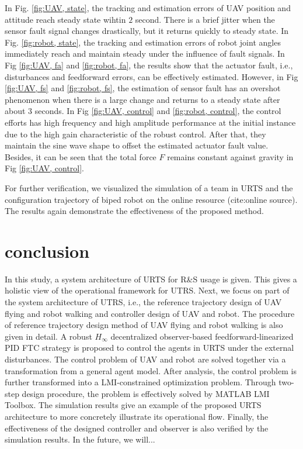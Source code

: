 \documentclass{ieeeaccess}
\begin{document}
In Fig. \ref{fig:UAV, state}, the tracking and estimation errors of UAV position and attitude reach steady state wihtin $2$ second. There is a brief jitter when the sensor fault signal changes drastically, but it returns quickly to steady state. In Fig. \ref{fig:robot, state}, the tracking and estimation errors of robot joint angles immediately reach and maintain steady under the influence of fault signals. In Fig \ref{fig:UAV, fa} and \ref{fig:robot, fa}, the results show that the actuator fault, i.e., disturbances and feedforward errors, can be effectively estimated. However, in Fig \ref{fig:UAV, fs} and \ref{fig:robot, fs}, the estimation of sensor fault has an overshot phenomenon when there is a large change and returns to a steady state after about $3$ seconds. In Fig \ref{fig:UAV, control} and \ref{fig:robot, control}, the control efforts has high frequency and high amplitude performance at the initial instance due to the high gain characteristic of the robust control. After that, they maintain the sine wave shape to offset the estimated actuator fault value. Besides, it can be seen that the total force $F$ remains constant against gravity in Fig \ref{fig:UAV, control}.

For further verification, we visualized the simulation of a team in URTS and the configuration trajectory of biped robot on the online resource (cite:online source). The results again demonstrate the effectiveness of the proposed method.

\section{conclusion}
In this study, a system architecture of URTS for R\&S usage is given. This gives a holistic view of the operational framework for UTRS. Next, we focus on part of the system architecture of UTRS, i.e., the reference trajectory design of UAV flying and robot walking and controller design of UAV and robot. The procedure of reference trajectory design method of UAV flying and robot walking is also given in detail. A robust $H_\infty$ decentralized observer-based feedforward-linearized PID FTC strategy is proposed to control the agents in URTS under the external disturbances. The control problem of UAV and robot are solved together via a transformation from a general agent model. After analysis, the control problem is further transformed into a LMI-constrained optimization problem. Through two-step design procedure, the problem is effectively solved by MATLAB LMI Toolbox. The simulation results give an example of the proposed URTS architecture to more concretely illustrate its operational flow. Finally, the effectiveness of the designed controller and observer is also verified by the simulation results. In the future, we will...





\EOD
\end{document}
